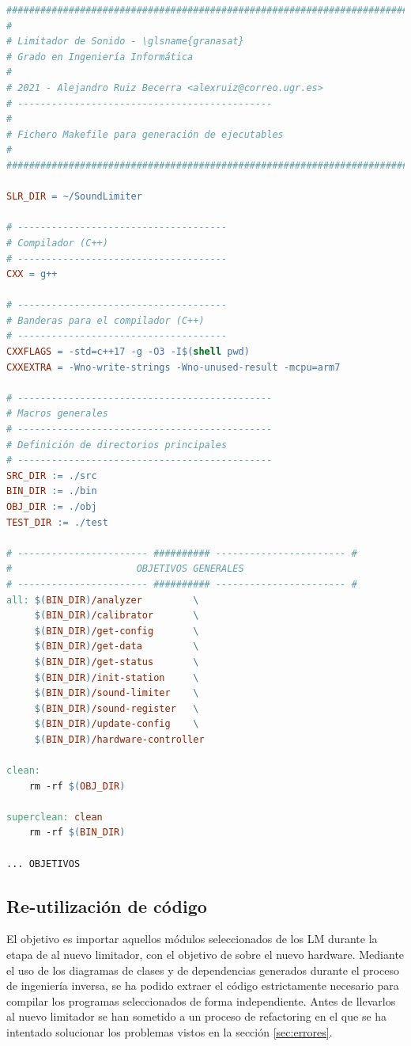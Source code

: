 \clearpage

\begin{lstlisting}[language=make, caption={Makefile del LM11}, label={lst:lms11-make}]
###############################################################################
#
# Limitador de Sonido - \glsname{granasat}
# Grado en Ingeniería Informática
#
# 2021 - Alejandro Ruiz Becerra <alexruiz@correo.ugr.es>
# ---------------------------------------------
#
# Fichero Makefile para generación de ejecutables
#
###############################################################################

SLR_DIR = ~/SoundLimiter

# -------------------------------------
# Compilador (C++)
# -------------------------------------
CXX = g++

# -------------------------------------
# Banderas para el compilador (C++)
# -------------------------------------
CXXFLAGS = -std=c++17 -g -O3 -I$(shell pwd)
CXXEXTRA = -Wno-write-strings -Wno-unused-result -mcpu=arm7

# ---------------------------------------------
# Macros generales
# ---------------------------------------------
# Definición de directorios principales
# ---------------------------------------------
SRC_DIR := ./src
BIN_DIR := ./bin
OBJ_DIR := ./obj
TEST_DIR := ./test

# ----------------------- ########## ----------------------- #
#                      OBJETIVOS GENERALES
# ----------------------- ########## ----------------------- #
all: $(BIN_DIR)/analyzer	     \
	 $(BIN_DIR)/calibrator       \
	 $(BIN_DIR)/get-config	     \
	 $(BIN_DIR)/get-data         \
	 $(BIN_DIR)/get-status	     \
	 $(BIN_DIR)/init-station     \
	 $(BIN_DIR)/sound-limiter    \
	 $(BIN_DIR)/sound-register   \
	 $(BIN_DIR)/update-config    \
	 $(BIN_DIR)/hardware-controller

clean:
	rm -rf $(OBJ_DIR)

superclean: clean
	rm -rf $(BIN_DIR)

... OBJETIVOS
\end{lstlisting}

\subsection{Re-utilización de código}

El objetivo es importar aquellos módulos seleccionados de los LM durante la etapa de  al nuevo limitador, con el objetivo de  sobre el nuevo hardware. Mediante el uso de los diagramas de clases y de dependencias generados durante el proceso de ingeniería inversa, se ha podido extraer el código estrictamente necesario para compilar los programas seleccionados de forma independiente. Antes de llevarlos al nuevo limitador se han sometido a un proceso de refactoring en el que se ha intentado solucionar los problemas vistos en la sección \ref{sec:errores}.

